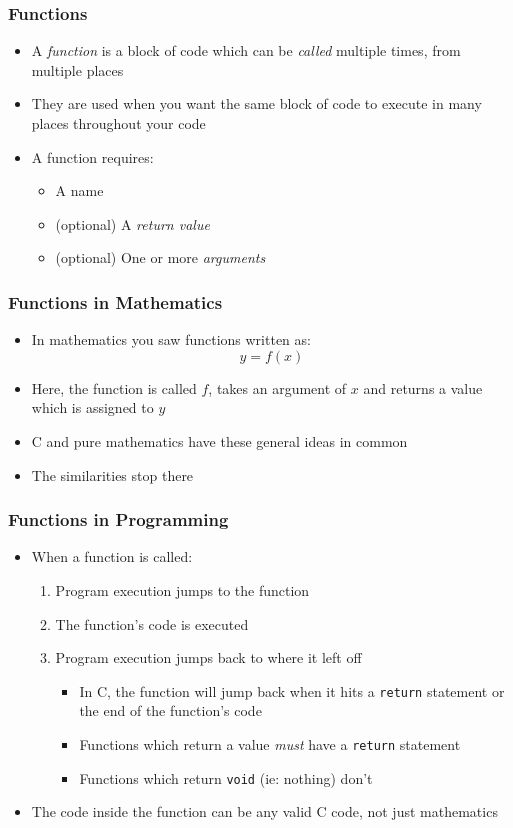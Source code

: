 \documentclass[14pt]{beamer}
\begin{document}
\begin{frame}
\frametitle{Functions}
\begin{itemize}
\item A \textit{function} is a block of code which can be \textit{called} multiple times, from multiple places
\item They are used when you want the same block of code to execute in many places throughout your code
\item A function requires:
	\begin{itemize}
		\item A name
		\item (optional) A \textit{return value}
		\item (optional) One or more \textit{arguments}
	\end{itemize}
\end{itemize}
\end{frame}

\begin{frame}
\frametitle{Functions in Mathematics}
\begin{itemize}
\item In mathematics you saw functions written as:
\begin{equation*}
y = f(x)
\end{equation*}
\item Here, the function is called $f$, takes an argument of $x$ and returns a value which is assigned to $y$
\item C and pure mathematics have these general ideas in common
\pause
\item The similarities stop there
\end{itemize}
\end{frame}

\begin{frame}[fragile]
\frametitle{Functions in Programming}
\begin{itemize}
\item When a function is called:
	\begin{enumerate}
		\item Program execution jumps to the function
		\item The function's code is executed
		\item Program execution jumps back to where it left off
			\begin{itemize}
				\item In C, the function will jump back when it hits a \texttt{return} statement or the end of the function's code
				\item Functions which return a value \textit{must} have a \texttt{return} statement
				\item Functions which return \texttt{void} (ie: nothing) don't
			\end{itemize}
	\end{enumerate}
\item The code inside the function can be any valid C code, not just mathematics
\end{itemize}
\end{frame}
\end{document}
